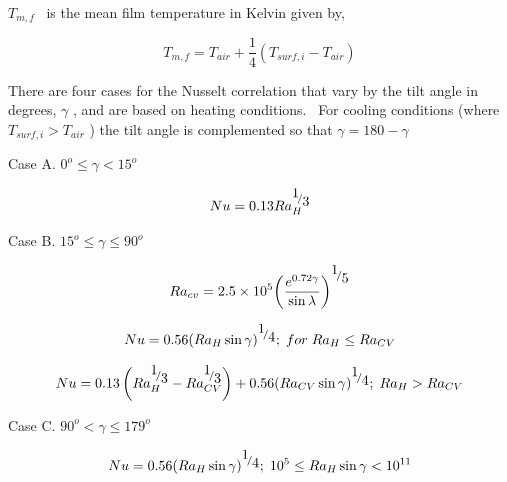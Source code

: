 \({T_{m,f}}\) ~is the mean film temperature in Kelvin given by,

\begin{equation}
{T_{m,f}} = {T_{air}} + \frac{1}{4}\left( {{T_{surf,i}} - {T_{air}}} \right)
\end{equation}

There are four cases for the Nusselt correlation that vary by the tilt angle in degrees, \(\gamma\) , and are based on heating conditions.~ For cooling conditions (where \({T_{surf,i}} > {T_{air}}\) ) the tilt angle is complemented so that \(\gamma = 180 - \gamma\)

Case A. \({0^o } \leq \gamma < 15^o\)

\begin{equation}
Nu = 0.13Ra_H^{{\raise0.7ex\hbox{1} \!\mathord{\left/ {\vphantom {1 3}}\right.}\!\lower0.7ex\hbox{3}}}
\end{equation}

Case B. \(15^o \leq \gamma \leq 90^o\)

\begin{equation}
R{a_{cv}} = 2.5 \times {10^5}{\left( {\frac{{{e^{0.72\gamma }}}}{{\sin \lambda }}} \right)^{{\raise0.7ex\hbox{1} \!\mathord{\left/ {\vphantom {1 5}}\right.}\!\lower0.7ex\hbox{5}}}}
\end{equation}

\begin{equation}
Nu = 0.56{\left( {R{a_H}\sin \gamma } \right)^{{\raise0.7ex\hbox{1} \!\mathord{\left/ {\vphantom {1 4}}\right.}\!\lower0.7ex\hbox{4}}}};\;for\;R{a_H} \le R{a_{CV}}
\end{equation}

\begin{equation}
Nu = 0.13\left( {Ra_H^{{\raise0.7ex\hbox{1} \!\mathord{\left/ {\vphantom {1 3}}\right.}\!\lower0.7ex\hbox{3}}} - Ra_{CV}^{{\raise0.7ex\hbox{1} \!\mathord{\left/ {\vphantom {1 3}}\right.}\!\lower0.7ex\hbox{3}}}} \right) + 0.56{\left( {R{a_{CV}}\sin \gamma } \right)^{{\raise0.7ex\hbox{1} \!\mathord{\left/ {\vphantom {1 4}}\right.}\!\lower0.7ex\hbox{4}}}};\;R{a_H} > R{a_{CV}}
\end{equation}

Case C. \(90^o < \gamma \leq 179^o\)

\begin{equation}
Nu = 0.56{\left( {R{a_H}\sin \gamma } \right)^{{\raise0.7ex\hbox{1} \!\mathord{\left/ {\vphantom {1 4}}\right.}\!\lower0.7ex\hbox{4}}}};\;{10^5} \le R{a_H}\sin \gamma  < {10^{11}}
\end{equation}

